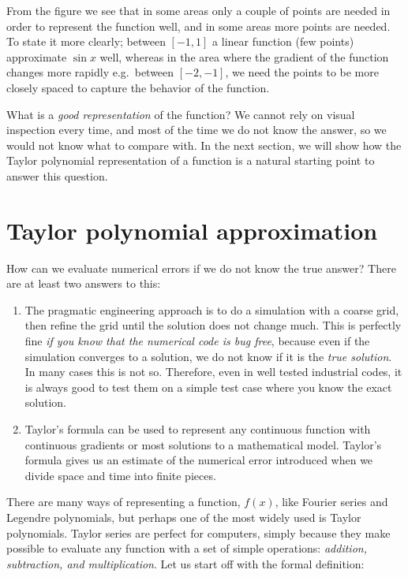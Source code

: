 \documentclass[graybox,sectrefs,envcountresetchap,open=right,final]{svmonodo}
\begin{document}
From the figure we see that in some areas only a couple of points are needed in order to
represent the function well, and in some areas more points are needed. To state it more clearly; between $[-1,1]$ a linear function (few points) approximate $\sin x$ well, 
whereas in the area where the gradient of the function changes more rapidly e.g.~between $[-2,-1]$, we need the points to be more closely spaced to capture the behavior of the function.

What is a \emph{good representation} of the function? We cannot rely on visual inspection every time, and most of the time we do not know the answer, so we would not know what to compare with. In the next section, we will show how the Taylor polynomial representation of a function is a natural starting point to answer this question.

\section{Taylor polynomial approximation}
How can we evaluate numerical errors if we do not know the true answer? There are at least two answers to this:

\begin{enumerate}
\item The pragmatic engineering approach is to do a simulation with a coarse grid, then refine the grid until the solution does not change much. This is perfectly fine \emph{if you know that the numerical code is bug free}, because even if the simulation converges to a solution, we do not know if it is the \emph{true solution}. In many cases this is not so. Therefore, even in well tested industrial codes, it is always good to test them on a simple test case where you know the exact solution.

\item Taylor's formula can be used to represent any continuous function with continuous gradients or most solutions to a mathematical model. Taylor's formula gives us an estimate of the numerical error introduced when we divide space and time into finite pieces.
\end{enumerate}

\noindent
There are many ways of representing a function, $f(x)$, like Fourier series and Legendre polynomials, but perhaps one of the most widely used is Taylor polynomials.   
Taylor series are perfect for computers, simply because they make possible to evaluate any function with a set of simple operations: \emph{addition, subtraction, and multiplication}. Let us start off with the formal definition: 
\end{document}
